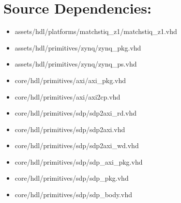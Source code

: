 \documentclass{article}
\begin{document}
\newpage
\section*{Source Dependencies:}
\begin{itemize}
	\item
assets/hdl/platforms/matchstiq\_z1/matchstiq\_z1.vhd
	\item
assets/hdl/primitives/zynq/zynq\_pkg.vhd
	\item
assets/hdl/primitives/zynq/zynq\_ps.vhd
	\item
core/hdl/primitives/axi/axi\_pkg.vhd
	\item
core/hdl/primitives/axi/axi2cp.vhd
	\item
core/hdl/primitives/sdp/sdp2axi\_rd.vhd
	\item
core/hdl/primitives/sdp/sdp2axi.vhd
	\item
core/hdl/primitives/sdp/sdp2axi\_wd.vhd
	\item
core/hdl/primitives/sdp/sdp\_axi\_pkg.vhd
	\item
core/hdl/primitives/sdp/sdp\_pkg.vhd
	\item
core/hdl/primitives/sdp/sdp\_body.vhd
\end{itemize}
\end{document}
